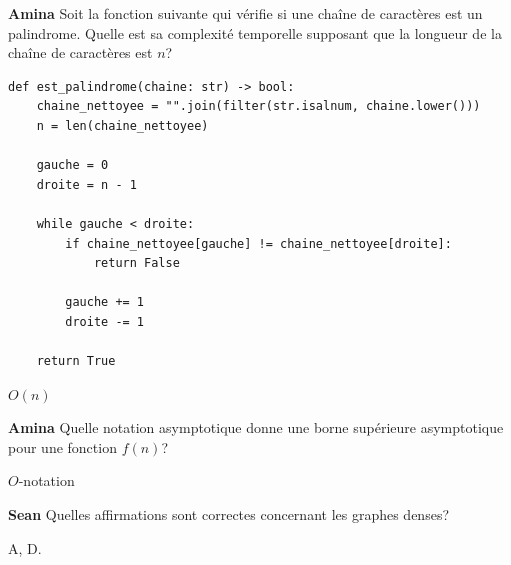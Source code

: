 \begin{Exercice}[5 minutes]\textbf{Amina}
Soit la fonction suivante qui vérifie si une chaîne de caractères est un palindrome. Quelle est sa complexité temporelle supposant que la longueur de la chaîne de caractères est $n$?

\begin{lstlisting}[style=pythonstyle]
def est_palindrome(chaine: str) -> bool:
    chaine_nettoyee = "".join(filter(str.isalnum, chaine.lower()))
    n = len(chaine_nettoyee)
    
    gauche = 0
    droite = n - 1
    
    while gauche < droite:
        if chaine_nettoyee[gauche] != chaine_nettoyee[droite]:
            return False
            
        gauche += 1
        droite -= 1
        
    return True
\end{lstlisting}


\begin{solution}
$O(n)$
\end{solution}

\end{Exercice}

\begin{Exercice}[5 minutes]\textbf{Amina}
Quelle notation asymptotique donne une borne supérieure asymptotique pour une fonction $f(n)$?



\begin{solution}
$O$-notation
\end{solution}

\end{Exercice}

\begin{Exercice}[5 minutes]\textbf{Sean}
Quelles affirmations sont correctes concernant les graphes denses?


\begin{solution}
A, D.
\end{solution}
\end{Exercice}


